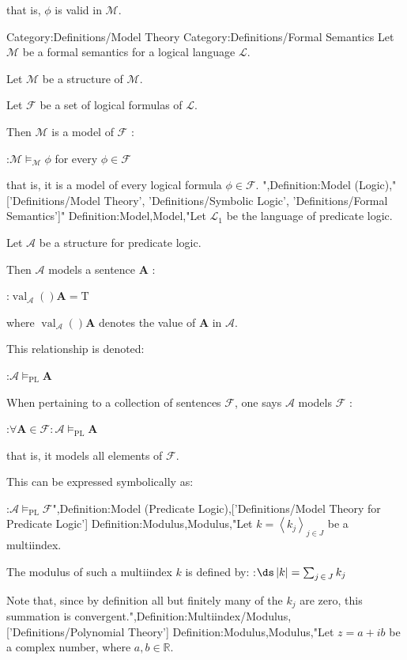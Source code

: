 that is,  $\phi$ is valid in $\mathcal M$.




Category:Definitions/Model Theory
Category:Definitions/Formal Semantics
Let $\mathscr M$ be a formal semantics for a logical language $\mathcal L$.

Let $\mathcal M$ be a structure of $\mathscr M$.


Let $\mathcal F$ be a set of logical formulas of $\mathcal L$.

Then $\mathcal M$ is a model of $\mathcal F$ :

:$\mathcal M \models_{\mathscr M} \phi$ for every $\phi \in \mathcal F$

that is,  it is a model of every logical formula $\phi \in \mathcal F$.
",Definition:Model (Logic),"['Definitions/Model Theory', 'Definitions/Symbolic Logic', 'Definitions/Formal Semantics']"
Definition:Model,Model,"Let $\mathcal L_1$ be the language of predicate logic.

Let $\mathcal A$ be a structure for predicate logic.


Then $\mathcal A$ models a sentence $\mathbf A$ :

:$\operatorname{val}_\mathcal A \left(   \right){\mathbf A} = \mathrm T$

where $\operatorname{val}_\mathcal A \left(   \right){\mathbf A}$ denotes the value of $\mathbf A$ in $\mathcal A$.


This relationship is denoted:

:$\mathcal A \models_{\mathrm{PL} } \mathbf A$


When pertaining to a collection of sentences $\mathcal F$, one says $\mathcal A$ models $\mathcal F$ :

:$\forall \mathbf A \in \mathcal F: \mathcal A \models_{\mathrm{PL} } \mathbf A$

that is,  it models all elements of $\mathcal F$.

This can be expressed symbolically as:

:$\mathcal A \models_{\mathrm {PL} } \mathcal F$",Definition:Model (Predicate Logic),['Definitions/Model Theory for Predicate Logic']
Definition:Modulus,Modulus,"Let $k = \left\langle k_j \right\rangle_{j \mathop \in J}$ be a multiindex.


The modulus of such a multiindex $k$  is defined by:
:$\ds \left\lvert k \right\rvert = \sum_{j \mathop \in J} k_j$




Note that, since by definition all but finitely many of the $k_j$ are zero, this summation is convergent.",Definition:Multiindex/Modulus,['Definitions/Polynomial Theory']
Definition:Modulus,Modulus,"Let $z = a + i b$ be a complex number, where $a, b \in \mathbb R$.


